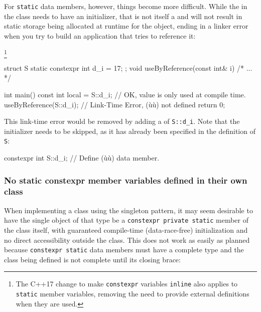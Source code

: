 For \lstinline!static! data members, however, things become more difficult.  While the  in the
class  needs to have an initializer, that is not itself a  and will
not result in static storage being allocated at runtime for the object, ending in a linker error when you try to
build an application that tries to reference it:{\cprotect\footnote{The C++17 change to make \lstinline!constexpr! variables \lstinline!inline! also applies
to \lstinline!static! member variables, removing the need to provide external definitions when they are used.}


\begin{emcppslisting}[emcppsbatch=e4]
struct S {
    static constexpr int d_i = 17;
};
void useByReference(const int& i) { /* ... */ }

int main()
{
    const int local = S::d_i;  // OK, value is only used at compile time.
    useByReference(S::d_i);    // Link-Time Error, (ù{}ù) not defined
    return 0;
}
\end{emcppslisting}

This link-time error would be removed by adding a  of \lstinline!S::d_i!.  Note that the
initializer needs to be skipped, as it has already been specified in the definition of \lstinline!S!:

\begin{emcppslisting}[emcppsbatch=e4]
constexpr int S::d_i;  // Define (ù{}ù) data member.
\end{emcppslisting}

\subsubsection[No static \lstinline!constexpr! member variables defined in their own class]{No static {\SubsubsecCode constexpr} member variables defined in their own class}\label{no-static-constexpr-member-variables-defined-in-their-own-class}

When implementing a class using the singleton pattern, it may seem
desirable to have the single object of that type be a
\lstinline!constexpr!~\lstinline!private!~\lstinline!static! member of the class
itself, with guaranteed compile-time (data-race-free) initialization and
no direct accessibility outside the class. This does not work as easily
as planned because \lstinline!constexpr!~\lstinline!static! data members must
have a complete type and the class being defined is not complete until
its closing brace:

}

